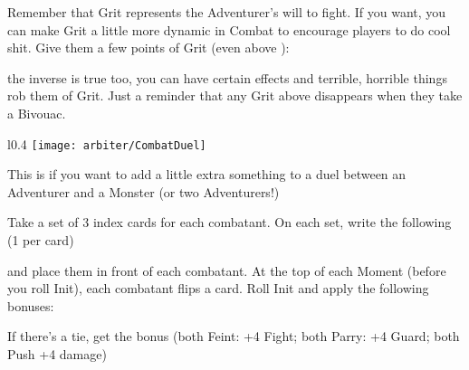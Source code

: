 {

Remember that Grit represents the Adventurer's will to fight. If you want, you can make Grit a little more dynamic in Combat to encourage players to do cool shit. Give them a few points of Grit (even above \MAX):


the inverse is true too, you can have certain effects and terrible, horrible things rob them of Grit. Just a reminder that any Grit above \MAX disappears when they take a Bivouac.




\begin{wrapfigure}[9]{l}{0.4\textwidth}
    \texttt{[image: arbiter/CombatDuel]}
\end{wrapfigure}

This is if you want to add a little extra something to a duel between an Adventurer and a Monster (or two Adventurers!)

Take a set of 3 index cards for each combatant.  On each set, write the following (1 per card)






and place them in front of each combatant. At the top of each Moment (before you roll Init), each combatant flips a card. Roll Init and apply the following bonuses:


If there's a tie,  get the bonus (both Feint: +4 Fight; both Parry: +4 Guard; both Push +4 damage)

}
